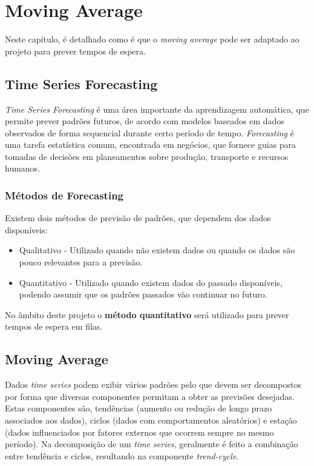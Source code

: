 
\chapter{Moving Average}
\label{cha:movingAverage}

Neste capítulo, é detalhado como é que o \textit{moving average} pode ser adaptado ao projeto para prever tempos de espera.

\section{Time Series Forecasting}
\label{sec:timeseries}


\textit{Time Series Forecasting} \cite{forecasting} é uma área importante da aprendizagem automática, que permite prever padrões futuros, de acordo com modelos baseados em dados observados de forma sequencial durante certo período de tempo. 
\textit{Forecasting} é uma tarefa estatística comum, encontrada em negócios, que fornece guias para tomadas de decisões em planeamentos sobre produção, transporte e recursos humanos. 

\subsection{Métodos de Forecasting}
\label{sec:forecastingmethods}

Existem dois métodos de previsão de padrões, que dependem dos dados disponíveis:
\begin{itemize}
	\item Qualitativo - Utilizado quando não existem dados ou quando os dados são pouco relevantes para a previsão.
	\item Quantitativo - Utilizado quando existem dados do passado disponíveis, podendo assumir que os padrões passados vão continuar no futuro.
\end{itemize}

No âmbito deste projeto o \textbf{método quantitativo} será utilizado para prever tempos de espera em filas. 

\section{Moving Average}
\label{sec:movingaveragesection}

Dados \textit{time series} podem exibir vários padrões pelo que devem ser decompostos por forma que diversas componentes permitam a obter as previsões desejadas. Estas componentes são, tendências (aumento ou redução de longo prazo associados aos dados), ciclos (dados com comportamentos aleatórios) e estação (dados influenciados por fatores externos que ocorrem sempre no mesmo período). Na decomposição de um \textit{time series}, geralmente é feito a combinação entre tendência e ciclos, resultando na componente \textit{trend-cycle}.

